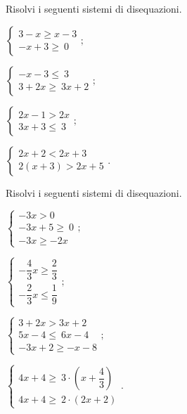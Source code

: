 \begin{esercizio}[\Ast]
 \label{ese:20.39}
 Risolvi i seguenti sistemi di disequazioni.
 \begin{multicols}{2}
 \begin{enumeratea}
 \item $\left\{\begin{array}{l}
	3-x\ge x-3\\
	-x+3\ge~0
	\end{array}\right.;$
\item $\left\{\begin{array}{l}
	-x-3\le~3\\
	3+2x\ge~3x+2
   \end{array}\right.;$
\item $\left\{\begin{array}{l}
	2x-1>2x \\
	3x+3\le~3
	\end{array}\right.;$
\item $\left\{\begin{array}{l}
	2x+2<2x+3\\
	2(x+3)>2x+5
	\end{array}\right..$
\end{enumeratea}
\end{multicols}
\end{esercizio}

\begin{esercizio}[\Ast]
 \label{ese:20.40}
 Risolvi i seguenti sistemi di disequazioni.
 \begin{multicols}{2}
 \begin{enumeratea}
 \item $\left\{\begin{array}{l}
	-3x>0\\
	-3x+5\ge~0\\
	-3x\ge-2x
	\end{array}\right.;$
\item {\longarray $\left\{\begin{array}{l}
	-{\dfrac{4}{3}}x\ge\dfrac{2}{3}\\
	-{\dfrac{2}{3}}x\le\dfrac{1}{9}
	\end{array}\right.;$}
\item $\left\{\begin{array}{l}
	3+2x>3x+2 \\
	5x-4\le~6x-4\\
	-3x+2\ge -x-8
	\end{array}\right.;$
\item $\left\{\begin{array}{l}
	4x+4\ge~3\cdot\left(x+\dfrac{4}{3}\right)\\
	4x+4\ge~2\cdot (2x+2)
	\end{array}\right..$
\end{enumeratea}
\end{multicols}
\end{esercizio}

